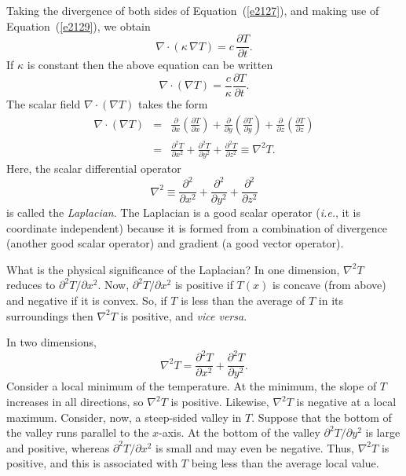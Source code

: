 Taking the divergence of both sides of Equation~(\ref{e2127}), and making use of Equation~(\ref{e2129}),
 we obtain
\begin{equation}
\nabla\cdot\left(\kappa \,\nabla T\right) = c\,\frac{\partial T}{\partial t}.
\end{equation}
If $\kappa$ is constant then the above equation  can be written
\begin{equation}
\nabla\cdot (\nabla T) = \frac{c}{\kappa} \frac{ \partial T}{\partial t}.
\end{equation}
The scalar field $\nabla\cdot (\nabla T)$ takes the form 
\begin{eqnarray}
\nabla\cdot(\nabla T) &=& 
\frac{\partial}{\partial x}\!\left(\frac{\partial T}{\partial x}\right)+
\frac{\partial}{\partial y}\!\left(\frac{\partial T}{\partial y}\right)+
\frac{\partial}{\partial z}\!\left(\frac{\partial T}{\partial z}\right)
\nonumber\\[0.5ex]
&=& \frac{\partial^2 T}{\partial x^2}+\frac{\partial^2 T}{\partial y^2} +
\frac{\partial^2 T}{\partial z^2} \equiv \nabla^2 T.
\end{eqnarray}
Here, the scalar differential operator
\begin{equation}
\nabla^2 \equiv \frac{\partial^2}{\partial x^2}+ 
\frac{\partial^2}{\partial y^2}+ \frac{\partial^2}{\partial z^2}
\end{equation}
is called the {\em Laplacian}. The Laplacian is a good scalar operator
({\em i.e.}, it is coordinate independent) because it is formed from a
combination of divergence
(another good scalar operator) and gradient (a good vector
operator). 

What is the physical significance of the Laplacian? In one dimension,
$\nabla^2 T$ reduces to $\partial^2 T/\partial x^2$.
Now, $\partial^2 T/\partial x^2$ is positive if $T(x)$ is
concave (from above) and negative if it is convex. So, if $T$ is less than the
average of $T$ in its surroundings then $\nabla^2 T$ is positive, and {\em vice
versa}. 

In two dimensions,
\begin{equation}
\nabla^2 T = \frac{\partial^2 T}{\partial x^2}+ \frac{\partial ^2 T}{\partial y^2}.
\end{equation}
Consider a local minimum of the temperature.
At the minimum, the slope of $T$ increases in all directions, so $\nabla^2 T$ is
positive. Likewise, $\nabla^2 T$ is negative at
 a local maximum.
Consider, now, a steep-sided valley in $T$. Suppose that the bottom of the
valley runs parallel to the $x$-axis. 
At the bottom of the
valley  $\partial^2 T/\partial y^2$ is large and positive, whereas
$\partial^2 T/\partial x^2$ is small and may even be negative. Thus, $\nabla^2 T$
is positive, and this is associated with $T$ being less than the average local
value.

